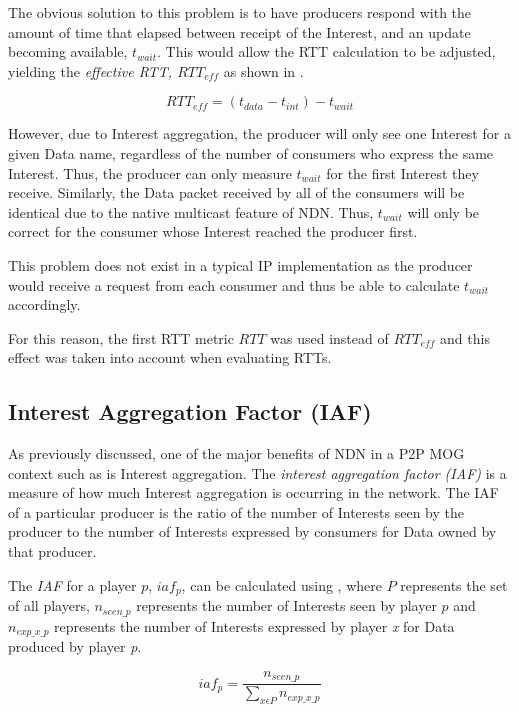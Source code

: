 The obvious solution to this problem is to have producers respond with the amount of time that elapsed between receipt of the Interest, and an update becoming available, $t_{wait}$. This would allow the RTT calculation to be adjusted, yielding the \textit{effective RTT, $RTT_{eff}$} as shown in .

\begin{equation}\label{eq:impl:rtt-eff}
    RTT_{eff} = (t_{data} - t_{int}) - t_{wait}
\end{equation}

However, due to Interest aggregation, the producer will only see one Interest for a given Data name, regardless of the number of consumers who express the same Interest. Thus, the producer can only measure $t_{wait}$ for the first Interest they receive. Similarly, the Data packet received by all of the consumers will be identical due to the native multicast feature of NDN. Thus, $t_{wait}$ will only be correct for the consumer whose Interest reached the producer first.

This problem does not exist in a typical IP implementation as the producer would receive a request from each consumer and thus be able to calculate $t_{wait}$ accordingly.

For this reason, the first RTT metric $RTT$ was used instead of $RTT_{eff}$ and this effect was taken into account when evaluating RTTs.


\subsection{Interest Aggregation Factor (IAF)}
As previously discussed, one of the major benefits of NDN in a P2P MOG context such as \game{} is Interest aggregation. The \textit{interest aggregation factor (IAF)} is a measure of how much Interest aggregation is occurring in the network. The IAF of a particular producer is the ratio of the number of Interests seen by the producer to the number of Interests expressed by consumers for Data owned by that producer.

The \textit{IAF} for a player $p$, $iaf_p$, can be calculated using , where $P$ represents the set of all players, $n_{seen\_p}$ represents the number of Interests seen by player $p$ and $n_{exp\_x\_p}$ represents the number of Interests expressed by player \textit{x} for Data produced by player \textit{p}.

\begin{equation}\label{eq:impl:iaf}
    iaf_p = \frac{n_{seen\_p}}{\sum\limits_{x \epsilon P}^{}{n_{exp\_x\_p}}}
\end{equation}


